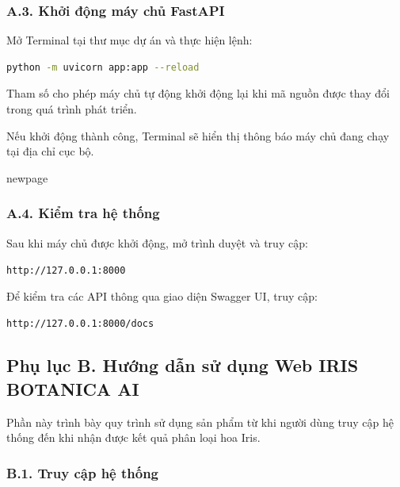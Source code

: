 \documentclass[14pt]{extarticle}
\begin{document}
	\subsubsection*{A.3. Khởi động máy chủ FastAPI}
	
	\noindent
	Mở Terminal tại thư mục dự án và thực hiện lệnh:
	
	\begin{lstlisting}[language=bash,
		numbers=none,
		frame=single,
		basicstyle=\ttfamily\small]
		python -m uvicorn app:app --reload
	\end{lstlisting}
	
	\noindent
	Tham số  cho phép máy chủ tự động khởi động lại khi
	mã nguồn được thay đổi trong quá trình phát triển.
	
	\noindent
	Nếu khởi động thành công, Terminal sẽ hiển thị thông báo máy chủ đang
	chạy tại địa chỉ cục bộ.
	
	newpage
	\newpage
	\subsubsection*{A.4. Kiểm tra hệ thống}
	
	\noindent
	Sau khi máy chủ được khởi động, mở trình duyệt và truy cập:
	
	\begin{center}
		\texttt{http://127.0.0.1:8000}
	\end{center}
	
	\noindent
	Để kiểm tra các API thông qua giao diện Swagger UI, truy cập:
	
	\begin{center}
		\texttt{http://127.0.0.1:8000/docs}
	\end{center}
	
	
	
	
	
	
	\subsection*{Phụ lục B. Hướng dẫn sử dụng Web IRIS BOTANICA AI}
	
	\noindent
	Phần này trình bày quy trình sử dụng sản phẩm từ khi người dùng truy cập
	hệ thống đến khi nhận được kết quả phân loại hoa Iris.
	
	\subsubsection*{B.1. Truy cập hệ thống}
	
\end{document}
